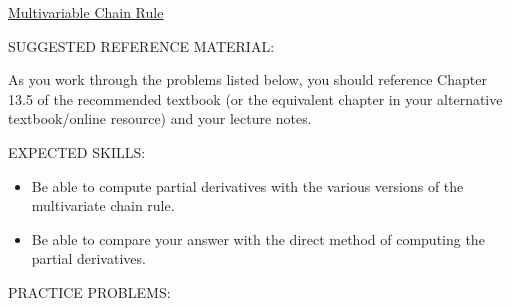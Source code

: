 \documentclass[12pt]{article}
\begin{document}
\begin{center}
\underline{\LARGE{Multivariable Chain Rule}}
\end{center}

\noindent SUGGESTED REFERENCE MATERIAL:

\bigskip

\noindent As you work through the problems listed below, you should reference Chapter 13.5 of the recommended textbook (or the equivalent chapter in your alternative textbook/online resource) and your lecture notes.

\bigskip

\noindent EXPECTED SKILLS:

\begin{itemize}

\item Be able to compute partial derivatives with the various versions of the multivariate chain rule. 

\item Be able to compare your answer with the direct method of computing the partial derivatives.

\end{itemize}

\noindent PRACTICE PROBLEMS:

\medskip
\end{document}
